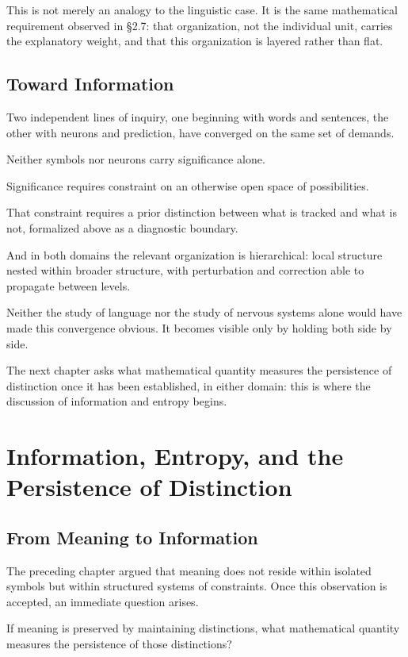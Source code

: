 \documentclass[11pt,oneside]{book}
\numberwithin{equation}{chapter}
\theoremstyle{definition}
\theoremstyle{plain}
\begin{document}
This is not merely an analogy to the linguistic case. It is the same
mathematical requirement observed in \S 2.7: that organization, not the
individual unit, carries the explanatory weight, and that this organization
is layered rather than flat.

\section{Toward Information}

Two independent lines of inquiry, one beginning with words and sentences,
the other with neurons and prediction, have converged on the same set of
demands.

Neither symbols nor neurons carry significance alone.

Significance requires constraint on an otherwise open space of
possibilities.

That constraint requires a prior distinction between what is tracked and
what is not, formalized above as a diagnostic boundary.

And in both domains the relevant organization is hierarchical: local
structure nested within broader structure, with perturbation and correction
able to propagate between levels.

Neither the study of language nor the study of nervous systems alone would
have made this convergence obvious. It becomes visible only by holding both
side by side.

The next chapter asks what mathematical quantity measures the persistence of
distinction once it has been established, in either domain: this is where
the discussion of information and entropy begins.

\chapter{Information, Entropy, and the Persistence of Distinction}

\section{From Meaning to Information}

The preceding chapter argued that meaning does not reside within isolated
symbols but within structured systems of constraints. Once this observation
is accepted, an immediate question arises.

If meaning is preserved by maintaining distinctions, what mathematical
quantity measures the persistence of those distinctions?
\end{document}
